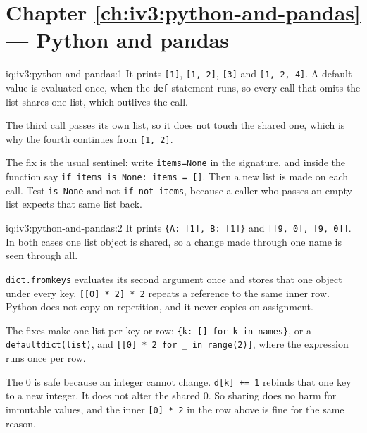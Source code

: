 

\section*{Chapter \ref{ch:iv3:python-and-pandas} --- Python and pandas}

\begin{solution}{iq:iv3:python-and-pandas:1}
It prints \texttt{[1]}, \texttt{[1, 2]}, \texttt{[3]} and \texttt{[1, 2, 4]}. A default value is evaluated once, when the \texttt{def} statement runs, so every call that omits the list shares one list, which outlives the call.

The third call passes its own list, so it does not touch the shared one, which is why the fourth continues from \texttt{[1, 2]}.

The fix is the usual sentinel: write \texttt{items=None} in the signature, and inside the function say \texttt{if items is None: items = []}. Then a new list is made on each call. Test \texttt{is None} and not \texttt{if not items}, because a caller who passes an empty list expects that same list back.

\end{solution}

\begin{solution}{iq:iv3:python-and-pandas:2}
It prints \texttt{\{\textquotesingle A\textquotesingle: [1], \textquotesingle B\textquotesingle: [1]\}} and \texttt{[[9, 0], [9, 0]]}. In both cases one list object is shared, so a change made through one name is seen through all.

\texttt{dict.fromkeys} evaluates its second argument once and stores that one object under every key. \texttt{[[0] * 2] * 2} repeats a reference to the same inner row. Python does not copy on repetition, and it never copies on assignment.

The fixes make one list per key or row: \texttt{\{k: [] for k in names\}}, or a \texttt{defaultdict(list)}, and \texttt{[[0] * 2 for \_ in range(2)]}, where the expression runs once per row.

The 0 is safe because an integer cannot change. \texttt{d[k] += 1} rebinds that one key to a new integer. It does not alter the shared 0. So sharing does no harm for immutable values, and the inner \texttt{[0] * 2} in the row above is fine for the same reason.

\end{solution}

